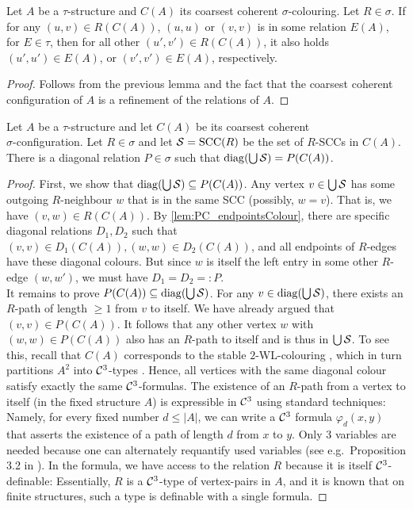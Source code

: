 \documentclass[a4paper,UKenglish,cleveref, autoref, thm-restate]{lipics-v2021}
\renewcommand{\phi}{\varphi}
\renewcommand{\phi}{\varphi}
\newcommand{\WL}{\textrm {WL}}
\newcommand{\Cc}{{\cal C}}
\newcommand{\Ss}{{\cal S}}
\newcommand{\sccs}{{\operatorname{SCC}}}
\newcommand{\diag}{{\operatorname{diag}}}
\begin{document}
	
	\begin{corollary}
		\label{cor:PC_endpointsColour}
		Let $A$ be a $\tau$-structure and $C(A)$ its coarsest coherent $\sigma$-colouring. Let $R \in \sigma$. If for any $(u,v) \in R(C(A))$, $(u,u)$ or $(v,v)$ is in some relation $E(A)$, for $E \in \tau$, then for all other $(u',v') \in R(C(A))$, it also holds $(u',u') \in E(A)$, or $(v',v') \in E(A)$, respectively.
	\end{corollary}
	\begin{proof}
		Follows from the previous lemma and the fact that the coarsest coherent configuration of $A$ is a refinement of the relations of $A$.
	\end{proof}
	
	\begin{lemma}
		\label{lem:PC_SCCsSingleColoured}
		Let $A$ be a $\tau$-structure and let $C(A)$ be its coarsest coherent \\$\sigma$-configuration. Let $R \in \sigma$ and let $\Ss = \sccs(R)$ be the set of $R$-SCCs in $C(A)$. There is a diagonal relation $P \in \sigma$ such that $\diag(\bigcup \Ss) = P(C(A))$.
	\end{lemma}
	\begin{proof}
		First, we show that $\diag(\bigcup \Ss) \subseteq P(C(A))$.	
		Any vertex $v \in \bigcup \Ss$ has some outgoing $R$-neighbour $w$ that is in the same SCC (possibly, $w = v$). That is, we have $(v,w) \in R(C(A))$. By \autoref{lem:PC_endpointsColour}, there are specific diagonal relations $D_1, D_2$ such that $(v,v) \in D_1(C(A)), (w,w) \in D_2(C(A))$, and all endpoints of $R$-edges have these diagonal colours. But since $w$ is itself the left entry in some other $R$-edge $(w,w')$, we must have $D_1 = D_2 =: P$.\\
		It remains to prove $P(C(A)) \subseteq \diag(\bigcup \Ss)$. For any $v \in \diag(\bigcup \Ss)$, there exists an $R$-path of length $\geq 1$ from $v$ to itself. We have already argued that $(v,v) \in P(C(A))$. It follows that any other vertex $w$ with $(w,w) \in P(C(A))$ also has an $R$-path to itself and is thus in $\bigcup \Ss$. To see this, recall that $C(A)$ corresponds to the stable $2$-\WL -colouring \cite{dwl}, which in turn partitions $A^2$ into $\Cc^3$-types \cite{sandraSiglog}. Hence, all vertices with the same diagonal colour satisfy exactly the same $\Cc^3$-formulas. 
		The existence of an $R$-path from a vertex to itself (in the fixed structure $A$) is expressible in $\Cc^3$ using standard techniques: Namely, for every fixed number $d \leq |A|$, we can write a $\Cc^3$ formula $\phi_d(x,y)$ that asserts the existence of a path of length $d$ from $x$ to $y$. Only $3$ variables are needed because one can alternately requantify used variables (see e.g.\ Proposition 3.2 in \cite{immermanLander}). In the formula, we have access to the relation $R$ because it is itself $\Cc^3$-definable: Essentially, $R$ is a $\Cc^3$-type of vertex-pairs in $A$, and it is known that on finite structures, such a type is definable with a single formula.
	\end{proof} 
	
\end{document}
